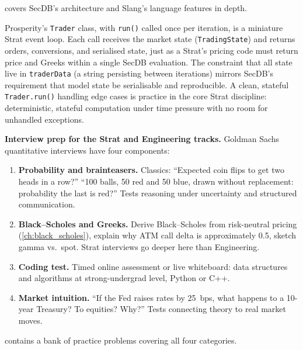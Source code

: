  covers SecDB's architecture and Slang's
language features in depth.


\begin{prosperitybox}
Prosperity's \texttt{Trader} class, with \texttt{run()} called once
per iteration, is a miniature Strat event loop.  Each call
receives the market state (\texttt{TradingState}) and returns
orders, conversions, and serialised state, just as a Strat's
pricing code must return price and Greeks within a single SecDB
evaluation.  The constraint that all state live in
\texttt{traderData} (a string persisting between iterations)
mirrors SecDB's requirement that model state be serialisable and
reproducible.  A clean, stateful \texttt{Trader.run()} handling
edge cases is practice in the core Strat discipline:
deterministic, stateful computation under time pressure with no
room for unhandled exceptions.
\end{prosperitybox}

\begin{gsbox}
\textbf{Interview prep for the Strat and Engineering tracks.}
Goldman Sachs quantitative interviews have four components:
\begin{enumerate}
  \item \textbf{Probability and brainteasers.}  Classics: ``Expected
    coin flips to get two heads in a row?''  ``100 balls, 50 red and
    50 blue, drawn without replacement: probability the last is
    red?''  Tests reasoning under uncertainty and structured
    communication.
  \item \textbf{Black--Scholes and Greeks.}  Derive Black--Scholes
    from risk-neutral pricing (\cref{ch:black_scholes}), explain
    why ATM call delta is approximately 0.5, sketch gamma vs.\
    spot.  Strat interviews go deeper here than Engineering.
  \item \textbf{Coding test.}  Timed online assessment or live
    whiteboard: data structures and algorithms at strong-undergrad
    level, Python or C++.
  \item \textbf{Market intuition.}  ``If the Fed raises rates by
    25~bps, what happens to a 10-year Treasury?  To equities?
    Why?''  Tests connecting theory to real market moves.
\end{enumerate}
 contains a bank of practice problems
covering all four categories.
\end{gsbox}

